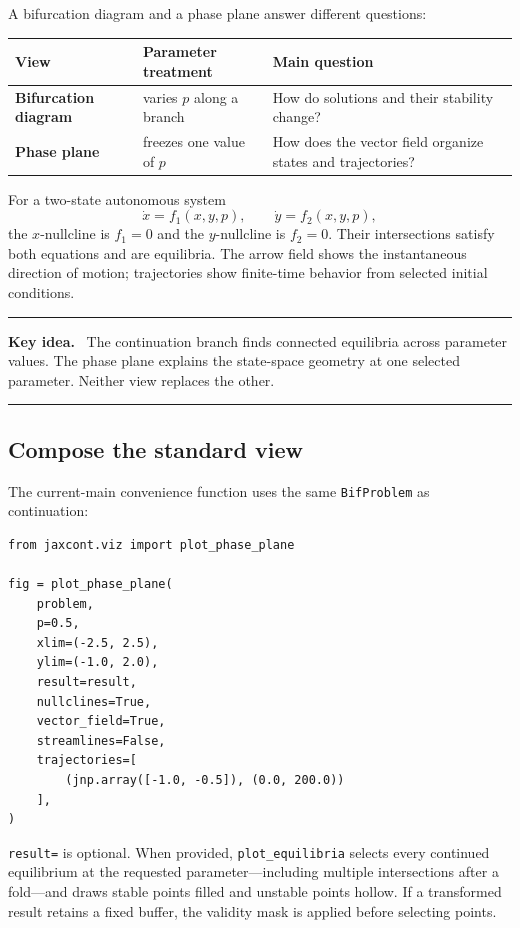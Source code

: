 \documentclass[11pt,oneside]{book}
\newenvironment{keyidea}
  {\par\medskip\noindent\begin{minipage}{\textwidth}
   \color{JaxBlue}\rule{\textwidth}{0.8pt}\par
   \textbf{Key idea.}\ \color{black}}
  {\par\color{JaxBlue}\rule{\textwidth}{0.8pt}
   \end{minipage}\par\medskip}
\begin{document}
A bifurcation diagram and a phase plane answer different questions:

\noindent\begin{tabularx}{\textwidth}{>{\bfseries}p{}XX}
\toprule
View & Parameter treatment & Main question\\
\midrule
Bifurcation diagram & varies $p$ along a branch & How do solutions and their
stability change?\\
Phase plane & freezes one value of $p$ & How does the vector field organize
states and trajectories?\\
\bottomrule
\end{tabularx}

For a two-state autonomous system
\[
  \dot x=f_1(x,y,p),\qquad \dot y=f_2(x,y,p),
\]
the $x$-nullcline is $f_1=0$ and the $y$-nullcline is $f_2=0$. Their
intersections satisfy both equations and are equilibria. The arrow field shows
the instantaneous direction of motion; trajectories show finite-time behavior
from selected initial conditions.

\begin{keyidea}
The continuation branch finds connected equilibria across parameter values.
The phase plane explains the state-space geometry at one selected parameter.
Neither view replaces the other.
\end{keyidea}

\subsection{Compose the standard view}

The current-main convenience function uses the same \texttt{BifProblem} as
continuation:

\begin{lstlisting}
from jaxcont.viz import plot_phase_plane

fig = plot_phase_plane(
    problem,
    p=0.5,
    xlim=(-2.5, 2.5),
    ylim=(-1.0, 2.0),
    result=result,
    nullclines=True,
    vector_field=True,
    streamlines=False,
    trajectories=[
        (jnp.array([-1.0, -0.5]), (0.0, 200.0))
    ],
)
\end{lstlisting}

\texttt{result=} is optional. When provided,
\texttt{plot\_equilibria} selects every continued equilibrium at the requested
parameter---including multiple intersections after a fold---and draws stable
points filled and unstable points hollow. If a transformed result retains a
fixed buffer, the validity mask is applied before selecting points.
\end{document}
